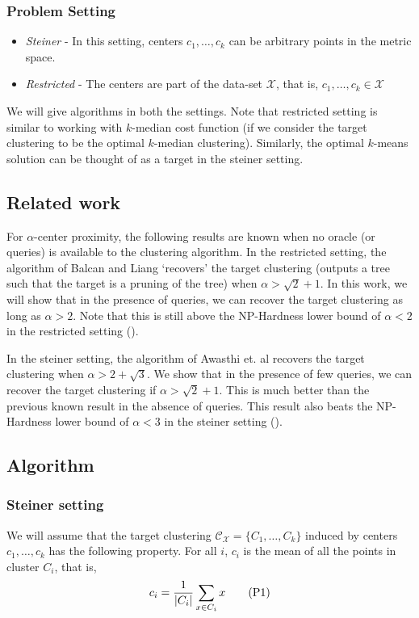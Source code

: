 \documentclass[11pt]{article}
\newcommand{\mc}{\mathcal}
\begin{document}
\subsubsection*{Problem Setting}
\begin{itemize}[nolistsep, noitemsep]
\item {\it Steiner} - In this setting, centers $c_1, \ldots, c_k$ can be arbitrary points in the metric space.
\item {\it Restricted} - The centers are part of the data-set $\mc X$, that is, $c_1, \ldots, c_k \in \mc X$ \\
\end{itemize}
We will give algorithms in both the settings. Note that restricted setting is similar to working with $k$-median cost function (if we consider the target clustering to be the optimal $k$-median clustering). Similarly, the optimal $k$-means solution can be thought of as a target in the steiner setting.

\subsection{Related work}
\label{section:relatedwork}
For $\alpha$-center proximity, the following results are known when no oracle (or queries) is available to the clustering algorithm. In the restricted setting, the algorithm of Balcan and Liang \cite{balcan2012clustering} `recovers' the target clustering (outputs a tree such that the target is a pruning of the tree) when $\alpha > \sqrt{2} + 1$. In this work, we will show that in the presence of queries, we can recover the target clustering as long as $\alpha > 2$. Note that this is still above the NP-Hardness lower bound of $\alpha < 2$ in the restricted setting (\cite{ben2014data}).

In the steiner setting, the algorithm of Awasthi et. al \cite{awasthi2012center} recovers the target clustering when $\alpha > 2+\sqrt{3}$. We show that in the presence of few queries, we can recover the target clustering if $\alpha > \sqrt{2}+1$. This is much better than the previous known result in the absence of queries. This result also beats the NP-Hardness lower bound of $\alpha < 3$ in the steiner setting (\cite{awasthi2012center}).

\subsection{Algorithm}
\subsubsection*{Steiner setting}
We will assume that the target clustering $\mc C_{\mc X} = \{C_1, \ldots, C_k\}$ induced by centers $c_1, \ldots, c_k$ has the following property. For all $i$, $c_i$ is the mean of all the points in cluster $C_i$, that is,
\begin{align}
c_i = \frac{1}{|C_i|}\sum_{x \in C_i} x \stepcounter{equation}\tag{P\theequation} \label{property:targetClust}
\end{align}
\end{document}
